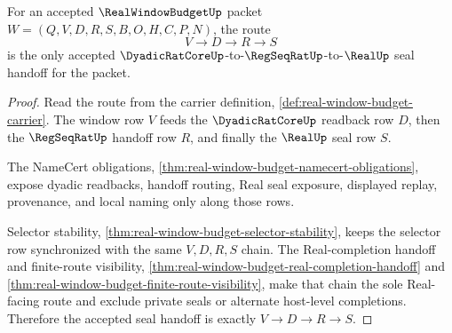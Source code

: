 \begin{theorem}
\label{thm:real-window-budget-dyadic-handoff-seal-obligation}
For an accepted $\RealWindowBudgetUp$ packet $W=(Q,V,D,R,S,B,O,H,C,P,N)$, the route
$$
V \to D \to R \to S
$$
is the only accepted $\DyadicRatCoreUp$-to-$\RegSeqRatUp$-to-$\RealUp$ seal handoff for the packet.
\end{theorem}
\begin{proof}
Read the route from the carrier definition, \autoref{def:real-window-budget-carrier}. The window row $V$ feeds the $\DyadicRatCoreUp$ readback row $D$, then the $\RegSeqRatUp$ handoff row $R$, and finally the $\RealUp$ seal row $S$.

The NameCert obligations, \autoref{thm:real-window-budget-namecert-obligations}, expose dyadic readbacks, handoff routing, Real seal exposure, displayed replay, provenance, and local naming only along those rows.

Selector stability, \autoref{thm:real-window-budget-selector-stability}, keeps the selector row synchronized with the same $V,D,R,S$ chain. The Real-completion handoff and finite-route visibility, \autoref{thm:real-window-budget-real-completion-handoff} and \autoref{thm:real-window-budget-finite-route-visibility}, make that chain the sole Real-facing route and exclude private seals or alternate host-level completions. Therefore the accepted seal handoff is exactly $V \to D \to R \to S$.
\end{proof}

